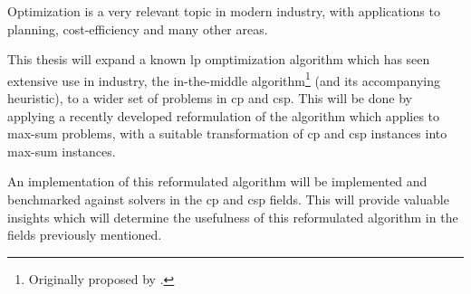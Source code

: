 Optimization is a very relevant topic in modern industry, with applications to planning, cost-efficiency and many other areas.


This thesis will expand a known \acrlong{lp} omptimization algorithm which has seen extensive use in industry, the in-the-middle algorithm\footnote{Originally proposed by \textcite{Wedelin95}.} (and its accompanying heuristic), to a wider set of problems in \acrlong{cp} and \acrlong{csp}.
This will be done by applying a recently developed reformulation of the algorithm which applies to max-sum problems, with a suitable transformation of \acrlong{cp} and \acrlong{csp} instances into max-sum instances.

An implementation of this reformulated algorithm will be implemented and benchmarked against solvers in the \acrlong{cp} and \acrlong{csp} fields.
This will provide valuable insights which will determine the usefulness of this reformulated algorithm in the fields previously mentioned.

